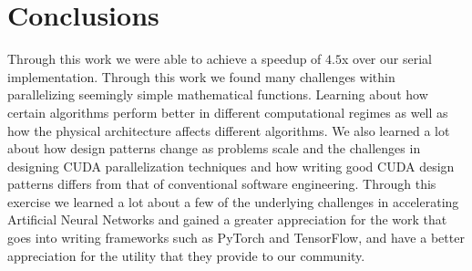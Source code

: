 \section{Conclusions}\label{sec:conclusions}
Through this work we were able to achieve a speedup of $4.5$x over our serial
implementation. Through this work we found many challenges within parallelizing
seemingly simple mathematical functions. Learning about how certain algorithms
perform better in different computational regimes as well as how the physical
architecture affects different algorithms. We also learned a lot about how
design patterns change as problems scale and the challenges in designing CUDA
parallelization techniques and how writing good CUDA design patterns differs
from that of conventional software engineering. Through this exercise we learned
a lot about a few of the underlying challenges in accelerating Artificial Neural
Networks and gained a greater appreciation for the work that goes into writing
frameworks such as PyTorch and TensorFlow, and have a better appreciation for
the utility that they provide to our community.

%
%
%
